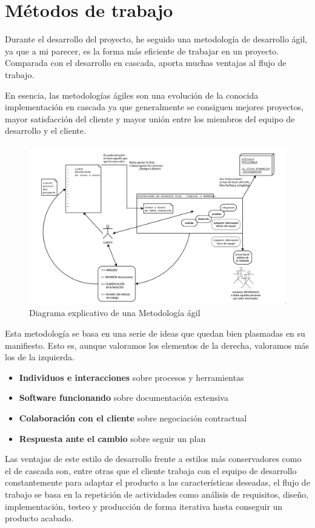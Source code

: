 \documentclass[titlepage, 12pt, a4paper]{article}
\begin{document}
\section{Métodos de trabajo}
Durante el desarrollo del proyecto, he seguido una metodología de desarrollo ágil, ya que a mi parecer, es la forma más eficiente de trabajar en un proyecto. Comparada con el desarrollo en cascada, aporta muchas ventajas al flujo de trabajo. \par
En esencia, las metodologías ágiles son una evolución de la conocida implementación en cascada ya que generalmente se consiguen mejores proyectos, mayor satisfacción del cliente y mayor unión entre los miembros del equipo de desarrollo y el cliente.
\begin{figure}[H]
    \centering
    \includegraphics[width=1\textwidth]{Media/agile.png}
    \caption{Diagrama explicativo de una Metodología ágil}
    \label{fig:agileMethodology}
\end{figure}
Esta metodología se basa en una serie de ideas que quedan bien plasmadas en su manifiesto. Esto es, aunque valoramos los elementos de la derecha, valoramos más los de la izquierda.\cite{agile} 
\begin{itemize}
	\item{\textbf{Individuos e interacciones} sobre procesos y herramientas}
	\item{\textbf{Software funcionando} sobre documentación extensiva}
	\item{\textbf{Colaboración con el cliente} sobre negociación contractual}
	\item{\textbf{Respuesta ante el cambio} sobre seguir un plan}
\end{itemize}\par
Las ventajas de este estilo de desarrollo frente a estilos más conservadores como el de cascada son, entre otras que el cliente trabaja con el equipo de desarrollo constantemente para adaptar el producto a las características deseadas, el flujo de trabajo se basa en la repetición de actividades como análisis de requisitos, diseño, implementación, testeo y producción de forma iterativa hasta conseguir un producto acabado.\par
\end{document}
